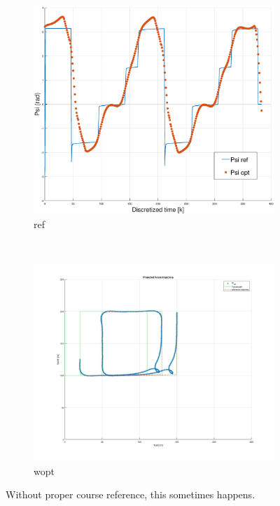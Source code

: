\clearpage
\begin{figure}[!ht] %
    \centering
    \begin{subfigure}{0.90\textwidth}
        \includegraphics[width=\textwidth]{Images/Figures/Extra_Stuff/WrapTo2Pi_problem_Ref}
        \caption{ref}
    \end{subfigure}
    \hfill
    \\
    \begin{subfigure}{0.90\textwidth}
        \includegraphics[width=\textwidth]{Images/Figures/Extra_Stuff/WrapTo2Pi_problem_Wopt}
        \caption{wopt}
    \end{subfigure}
    \caption{Without proper course reference, this sometimes happens.}
    \label{FIG: WrapTo2Pi misc}
\end{figure}

